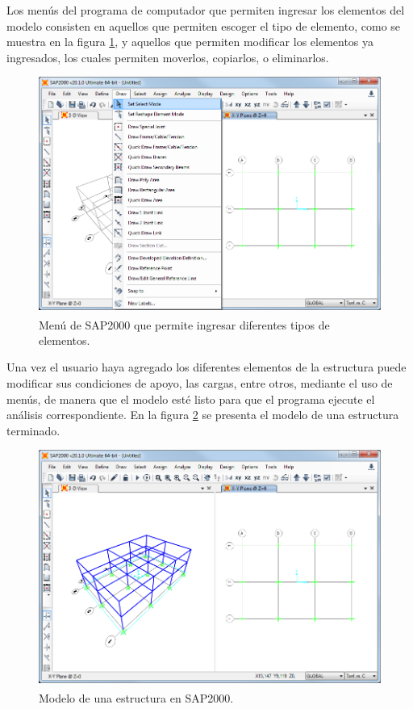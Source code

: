 Los menús del programa de computador que permiten ingresar los elementos del modelo consisten en aquellos que permiten escoger el tipo de elemento, como se muestra en la figura \ref{fig:sap200_draw}, y aquellos que permiten modificar los elementos ya ingresados, los cuales permiten moverlos, copiarlos, o eliminarlos. \\
\begin{figure}[ht]
    \centering
    \includegraphics[width=1\textwidth]{metodologia/sap2000_draw.png}
    \caption{Menú de SAP2000\textsuperscript{\textregistered} que permite ingresar diferentes tipos de elementos.}
    \label{fig:sap200_draw}
\end{figure}

Una vez el usuario haya agregado los diferentes elementos de la estructura puede modificar sus condiciones de apoyo, las cargas, entre otros, mediante el uso de menús, de manera que el modelo esté listo para que el programa ejecute el análisis correspondiente. En la figura \ref{fig:sap2000_model} se presenta el modelo de una estructura terminado.
\begin{figure}[ht]
    \centering
    \includegraphics[width=1\textwidth]{metodologia/sap2000_model.png}
    \caption{Modelo de una estructura en  SAP2000\textsuperscript{\textregistered}.}
    \label{fig:sap2000_model}
\end{figure}

